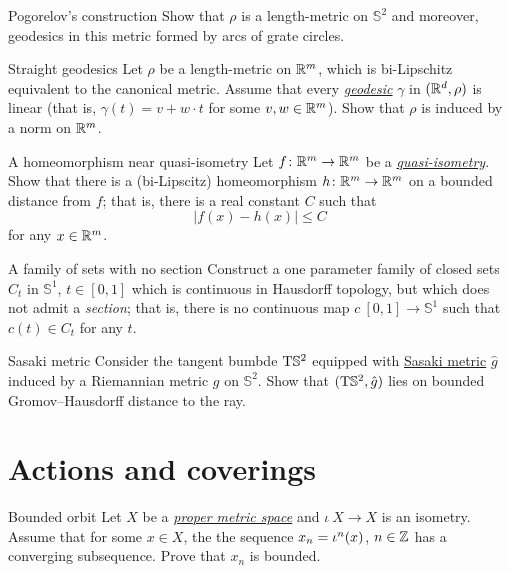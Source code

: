 \documentclass[twoside]{book}
\begin{document}
{\begin{pr}{}{Pogorelov's construction}
Show that $\rho$ is a length-metric on $\mathbb{S}^2$
and moreover, geodesics in this metric formed by arcs of grate circles.
\end{pr}

\begin{pr}{}{Straight geodesics}\label{Straight geodesics}
Let $\rho$ be a length-metric on $\mathbb{R}^m$, 
which is bi-Lipschitz equivalent to the canonical metric.
Assume that every \hyperref[Geodesic]{\emph{ge\-o\-de\-sic}} $\gamma$ in $(\mathbb{R}^d,\rho)$ is linear 
(that is, $\gamma(t)=v+w\cdot t$ for some $v,w\in\mathbb{R}^m$).
Show that $\rho$ is induced by a norm on $\mathbb{R}^m$.
\end{pr}

\begin{pr}{\thm}{A homeomorphism near quasi-isometry}\label{hom-near-QI} 
Let $f\colon\mathbb{R}^m\to\mathbb{R}^m$ be a \hyperref[Quasi-isometry]{\emph{quasi-isometry}}.
Show that there is a (bi-Lipscitz) homeomorphism 
$h\colon\mathbb{R}^m\to\mathbb{R}^m$ on a bounded distance from $f$;
that is, there is a real constant $C$ such that
$$|f(x)-h(x)|\le C$$
for any $x\in\mathbb{R}^m$.
\end{pr}

\begin{pr}{}{A family of sets with no section}\label{hausdorff-section} 
Construct a one parameter family of closed sets $C_t$ in $\mathbb{S}^1$, $t\in [0,1]$
which is continuous in Hausdorff topology, 
but which does not admit a \emph{section};
that is, there is no continuous 
map $c\:[0,1]\to \mathbb{S}^1$ such that $c(t)\in C_t$ for any $t$.
\end{pr}

\begin{pr}{}{Sasaki metric}\label{pr:Sasaki metric}
Consider the tangent bumbde $\mathrm{T} \mathbb{S}^2$ 
equipped with \hyperref[Sasaki metric]{Sasaki metric} $\hat g$ induced by a Riemannian metric $g$ on $\mathbb{S}^2$.
Show that $(\mathrm{T} \mathbb{S}^2, \hat g)$ lies on bounded Gromov--Hausdorff distance to the ray.
\end{pr}




\chapter{Actions and coverings}


\begin{pr}{}{Bounded orbit}\label{Bounded orbit} Let $X$ be a 
\hyperref[Proper metric space]{\emph{proper metric space}} 
and $\iota\:X\to X$ is an isometry.
Assume that for some $x\in X$, the the sequence $x_n\z=\iota^n(x)$, $n\in\mathbb{Z}$ has a converging subsequence.
Prove that $x_n$ is bounded.
\end{pr}

}
\end{document}
